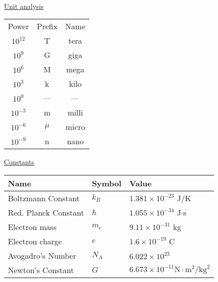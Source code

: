 \thispagestyle{empty}
\newcommand{\degrees}{$^\circ$}
\setlength{\parindent}{12pt}

\begin{center}
\\
\end{center}
\begin{multicols}{2}
\begin{minipage}{\columnwidth}
\centering\underline{Unit analysis}\\
\begin{tabular}{c c c}
Power & Prefix & Name\\
$10^{12}$ & T & tera\\
$10^9$ & G & giga\\
$10^6$ & M & mega\\
$10^3$ & k & kilo\\
$10^0$ & --- & ---\\
$10^{-3}$ & m & milli\\
$10^{-6}$ & $\mu$ & micro\\
$10^{-9}$ & n & nano
\end{tabular}
\end{minipage}


\vspace{8cm}
\begin{minipage}{\columnwidth}
\begin{center}\underline{Constants}\end{center}
\begin{tabular}{lll}
	Name&Symbol&Value\\ \hline
	Boltzmann Constant & $k_B$ & $1.381\times10^{-23}$ J/K\\
	Red. Planck Constant & $\hbar$ & $1.055\times10^{-34}$ J$\cdot$s\\
	Electron mass & $m_e$ & $9.11\times10^{-31}$ kg\\
	Electron charge & $e$ & $1.6\times 10^{-19}$ C\\
	Avogadro's Number &$N_A$& $6.022\times10^{23}$\\
	Newton's Constant &$G$ & $6.673\times10^{-11}\mathrm{N}\cdot\mathrm{m}^2/\mathrm{kg}^2$\\
\end{tabular}
\end{minipage}


\begin{minipage}{\columnwidth}
	

\end{minipage}
\end{multicols}
